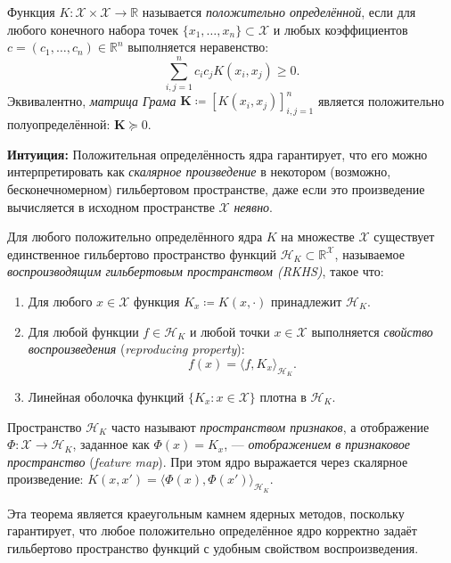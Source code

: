 \documentclass[../NDCNNAI_main.tex]{subfiles}
\begin{document}
\begin{definition}
\label{def:pd_kernel}
Функция \( K\colon \mathcal{X} \times \mathcal{X} \to \mathbb{R} \) называется \emph{положительно определённой}, если для любого конечного набора точек \(\{x_1, \ldots, x_n\} \subset \mathcal{X}\) и любых коэффициентов \( c = (c_1, \ldots, c_n) \in \mathbb{R}^n \) выполняется неравенство:
\[
\sum_{i,j=1}^{n} c_i c_j K(x_i, x_j) \geq 0.
\]
Эквивалентно, \emph{матрица Грама} \( \mathbf{K} \coloneq [K(x_i, x_j)]_{i,j=1}^n \) является положительно полуопределённой: \( \mathbf{K} \succeq 0 \).
\end{definition}
\textbf{Интуиция:} Положительная определённость ядра гарантирует, что его можно интерпретировать как \emph{скалярное произведение} в некотором (возможно, бесконечномерном) гильбертовом пространстве, даже если это произведение вычисляется в исходном пространстве \(\mathcal{X}\) \emph{неявно}.

\begin{theorem}
\label{thm:moore_aronszajn}
Для любого положительно определённого ядра \( K \) на множестве \(\mathcal{X}\) существует единственное гильбертово пространство функций \(\mathcal{H}_K \subset \mathbb{R}^{\mathcal{X}}\), называемое \emph{воспроизводящим гильбертовым пространством (RKHS)}, такое что:
\begin{enumerate}
    \item Для любого \( x \in \mathcal{X} \) функция \( K_x \coloneq K(x, \cdot) \) принадлежит \(\mathcal{H}_K\).
    \item Для любой функции \( f \in \mathcal{H}_K \) и любой точки \( x \in \mathcal{X} \) выполняется \emph{свойство воспроизведения} (\emph{reproducing property}):
    \[
    f(x) = \langle f, K_x \rangle_{\mathcal{H}_K}.
    \]
    \item Линейная оболочка функций \(\{K_x : x \in \mathcal{X}\}\) плотна в \(\mathcal{H}_K\).
\end{enumerate}
Пространство \(\mathcal{H}_K\) часто называют \emph{пространством признаков}, а отображение \(\Phi\colon \mathcal{X} \to \mathcal{H}_K\), заданное как \(\Phi(x) = K_x\), --- \emph{отображением в признаковое пространство} (\emph{feature map}). При этом ядро выражается через скалярное произведение: \( K(x, x') = \langle \Phi(x), \Phi(x')\rangle_{\mathcal{H}_K} \).
\end{theorem}
Эта теорема является краеугольным камнем ядерных методов, поскольку гарантирует, что любое положительно определённое ядро корректно задаёт гильбертово пространство функций с удобным свойством воспроизведения.
\end{document}
